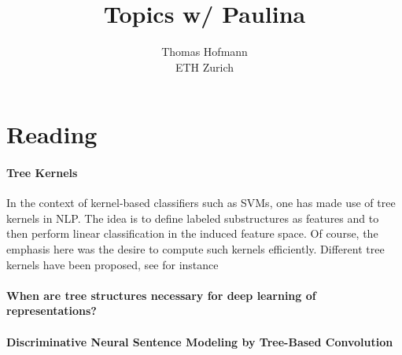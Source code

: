\documentclass{article}
\title{Topics w/ Paulina}
\author{Thomas Hofmann\\ ETH Zurich}
\begin{document}
\maketitle

\section{Reading}

\paragraph*{Tree Kernels}

In the context of kernel-based classifiers such as SVMs, one has made use of tree kernels in NLP. The idea is to define labeled substructures as features and to then perform linear classification in the induced feature space. Of course, the emphasis here was the desire to compute such kernels efficiently. Different tree kernels have been proposed, see for instance \cite{culotta2004dependency,moschitti2006efficient}

\paragraph*{When are tree structures necessary for deep learning of representations? \cite{li2015tree}}

\paragraph*{Discriminative Neural Sentence Modeling by Tree-Based Convolution}
\end{document}
